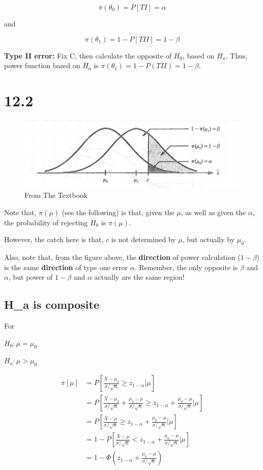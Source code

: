 \documentclass[]{book}
\begin{document}
\[\pi(\theta_0)=P[TI]=\alpha\]

and

\[\pi(\theta_1)=1-P[TII]=1-\beta\]

\textbf{Type II error: } Fix C, then calculate the opposite of \(H_0\), based on \(H_a\). Thus, power function based on \(H_a\) is \(\pi(\theta_1)=1-P(TII)=1-\beta\).

\hypertarget{section-5}{%
\section{12.2}\label{section-5}}

\begin{figure}
\centering
\includegraphics{556.PNG}
\caption{From The Textbook}
\end{figure}

Note that, \(\pi(\mu)\) (see the following) is that, given the \(\mu\), as well as given the \(\alpha\), the probability of rejecting \(H_0\) is \(\pi(\mu)\).

However, the catch here is that, \(c\) is not determined by \(\mu\), but actually by \(\mu_0\).

Also, note that, from the figure above, the \textbf{direction} of power calculation (\(1-\beta\)) is the same \textbf{direction} of type one error \(\alpha\). Remember, the only opposite is \(\beta\) and \(\alpha\), but power of \(1-\beta\) and \(\alpha\) actually are the same region!

\hypertarget{h_a-is-composite}{%
\subsection{H\_a is composite}\label{h_a-is-composite}}

For

\(H_0: \mu=\mu_0\)

\(H_a: \mu > \mu_0\)

\[\begin{aligned} \pi[\mu] &=P[\frac{\bar{X}-\mu_0}{\sigma/\sqrt{n}} \geq z_{1-\alpha} |\mu] \\ &=P[\frac{\bar{X}-\mu_0}{\sigma/\sqrt{n}}+\frac{\mu_0-\mu}{\sigma/\sqrt{n}} \geq z_{1-\alpha} +\frac{\mu_0-\mu}{\sigma/\sqrt{n}}|\mu]  \\ &=P[\frac{\bar{X}-\mu}{\sigma/\sqrt{n}}\geq z_{1-\alpha} +\frac{\mu_0-\mu}{\sigma/\sqrt{n}}|\mu] \\ &=1-P[\frac{\bar{X}-\mu}{\sigma/\sqrt{n}}<z_{1-\alpha} +\frac{\mu_0-\mu}{\sigma/\sqrt{n}}|\mu] \\ &=1-\Phi(z_{1-\alpha} +\frac{\mu_0-\mu}{\sigma/\sqrt{n}}) \end{aligned}\]
\end{document}
